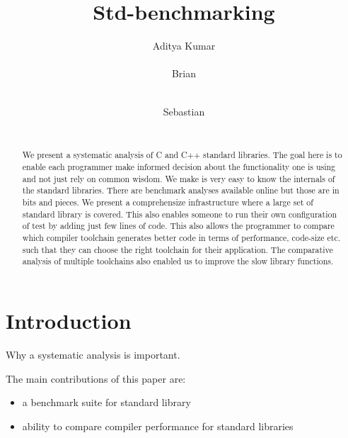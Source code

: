 \documentclass{sig-alternate}
\begin{document}
\def \GCC {GCC}
\def \LLVM {LLVM}

\setlength{\pdfpageheight}{\paperheight}
\setlength{\pdfpagewidth}{\paperwidth}

\title{Std-benchmarking}


\author{
\alignauthor
Aditya Kumar\\
       \\
\alignauthor
Brian\\
       \\
\and
\alignauthor
Sebastian\\
       \\
}

\maketitle
\begin{abstract}
We present a systematic analysis of C and C++ standard libraries. The goal
here is to enable each programmer make informed decision about the functionality
one is using and not just rely on common wisdom. We make is very easy to know
the internals of the standard libraries. There are benchmark analyses available
online but those are in bits and pieces. We present a comprehensize infrastructure
where a large set of standard library is covered. This also enables someone
to run their own configuration of test by adding just few lines of code. This also
allows the programmer to compare which compiler toolchain generates better code
in terms of performance, code-size etc. such that they can choose the right
toolchain for their application. The comparative analysis of multiple toolchains
also enabled us to improve the slow library functions.
\end{abstract}

\section{Introduction}
Why a systematic analysis is important.

The main contributions of this paper are:
\begin{itemize}
\item a benchmark suite for standard library
\item ability to compare compiler performance for standard libraries
\end{itemize}
\end{document}
